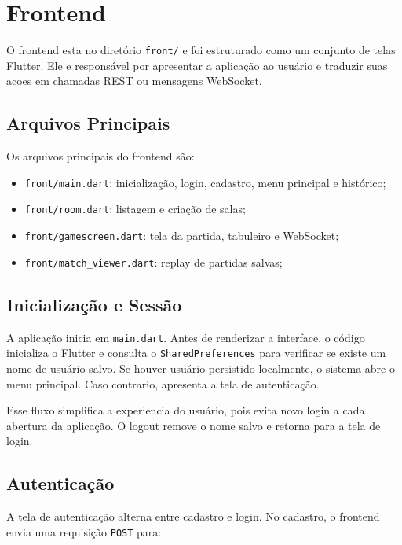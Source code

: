 \documentclass[12pt]{article}
\begin{document}
\section{Frontend}

O frontend esta no diretório \texttt{front/} e foi estruturado como um conjunto de telas Flutter. Ele e responsável por apresentar a aplicação ao usuário e traduzir suas acoes em chamadas REST ou mensagens WebSocket.

\subsection{Arquivos Principais}

Os arquivos principais do frontend são:

\begin{itemize}
    \item \texttt{front/main.dart}: inicialização, login, cadastro, menu principal e histórico;
    \item \texttt{front/room.dart}: listagem e criação de salas;
    \item \texttt{front/gamescreen.dart}: tela da partida, tabuleiro e WebSocket;
    \item \texttt{front/match\_viewer.dart}: replay de partidas salvas;
\end{itemize}

\subsection{Inicialização e Sessão}

A aplicação inicia em \texttt{main.dart}. Antes de renderizar a interface, o código inicializa o Flutter e consulta o \texttt{SharedPreferences} para verificar se existe um nome de usuário salvo. Se houver usuário persistido localmente, o sistema abre o menu principal. Caso contrario, apresenta a tela de autenticação.

Esse fluxo simplifica a experiencia do usuário, pois evita novo login a cada abertura da aplicação. O logout remove o nome salvo e retorna para a tela de login.

\subsection{Autenticação}

A tela de autenticação alterna entre cadastro e login. No cadastro, o frontend envia uma requisição \texttt{POST} para:
\end{document}
